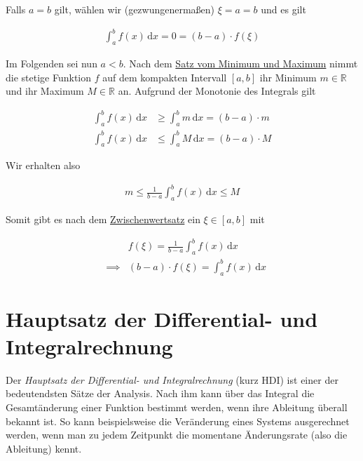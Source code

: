 \documentclass[fontsize=9pt,
               parskip=half-,
               DIV=14,
               listof=chapterentry,
               tocflat]{scrbook}
\begin{document}
\begin{proof*}
Falls $a=b$ gilt, wählen wir (gezwungenermaßen) $\xi =a=b$ und es gilt

\begin{align*}
\int _{a}^{b}f(x)\,\mathrm {d} x=0=(b-a)\cdot f(\xi )
\end{align*}

Im Folgenden sei nun $a<b$. Nach dem \href{https://de.wikibooks.org/wiki/Mathe\_für\_Nicht-Freaks:\_Satz\_vom\_Minimum\_und\_Maximum}
{Satz vom Minimum und Maximum} nimmt die stetige Funktion $f$ auf dem kompakten Intervall $[a,b]$ ihr Minimum $m\in \mathbb {R} $ und ihr Maximum $M\in \mathbb {R} $ an. Aufgrund der Monotonie des Integrals gilt

\begin{align*}
\int _{a}^{b}f(x)\,\mathrm {d} x&\geq \int _{a}^{b}m\,\mathrm {d} x=(b-a)\cdot m\\\int _{a}^{b}f(x)\,\mathrm {d} x&\leq \int _{a}^{b}M\,\mathrm {d} x=(b-a)\cdot M
\end{align*}

Wir erhalten also

\begin{align*}
m\leq {\frac {1}{b-a}}\int _{a}^{b}f(x)\,\mathrm {d} x\leq M
\end{align*}

Somit gibt es nach dem \href{https://de.wikibooks.org/wiki/Mathe\_für\_Nicht-Freaks:\_Zwischenwertsatz}
{Zwischenwertsatz} ein $\xi \in [a,b]$ mit

\begin{align*}
&&f(\xi )={\frac {1}{b-a}}\int _{a}^{b}f(x)\,\mathrm {d} x\\[0.5em]&\implies &(b-a)\cdot f(\xi )=\int _{a}^{b}f(x)\,\mathrm {d} x
\end{align*}

\end{proof*}

\chapter{Hauptsatz der Differential- und Integralrechnung}

Der \emph{Hauptsatz der Differential- und Integralrechnung} (kurz HDI) ist einer der bedeutendsten Sätze der Analysis. Nach ihm kann über das Integral die Gesamtänderung einer Funktion bestimmt werden, wenn ihre Ableitung überall bekannt ist. So kann beispielsweise die Veränderung eines Systems ausgerechnet werden, wenn man zu jedem Zeitpunkt die momentane Änderungsrate (also die Ableitung) kennt.
\end{document}
